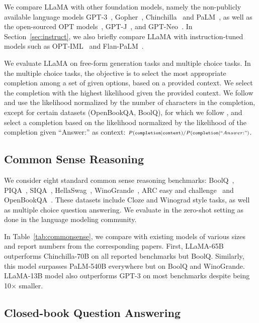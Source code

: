 We compare LLaMA with other foundation models, namely the non-publicly available language models GPT-3~\citep{brown2020gpt3}, Gopher~\citep{rae2021goepher}, Chinchilla~\citep{hoffmann2022chinchilla} and PaLM~\citep{chowdhery2022palm}, as well as the open-sourced OPT models~\citep{zhang2022opt}, GPT-J~\citep{gptj}, and GPT-Neo~\citep{black2022gpt}. In Section~\ref{sec:instruct}, we also briefly compare LLaMA with instruction-tuned models such as OPT-IML~\cite{iyer2022opt} and Flan-PaLM~\cite{Chung2022ScalingIL}.

We evaluate LLaMA on free-form generation tasks and multiple choice tasks. In the multiple choice tasks, the objective is to select the most appropriate completion among a set of given options, based on a provided context. We select the completion with the highest likelihood given the provided context. We follow \citet{eval-harness} and use the likelihood normalized by the number of characters in the completion, except for certain datasets (OpenBookQA, BoolQ), for which we follow \citet{brown2020gpt3}, and select a completion based on the likelihood normalized by the likelihood of the completion given ``Answer:'' as context: ${\scriptstyle P ( \mathtt{completion} \mid \mathtt{context})/P(\mathtt{completion} \mid ``Answer:" ) }$.

\subsection{Common Sense Reasoning}

We consider eight standard common sense reasoning benchmarks: BoolQ~\citep{clark2019boolq}, PIQA~\citep{bisk2020piqa}, SIQA~\citep{sap2019socialiqa}, HellaSwag~\citep{zellers2019hellaswag}, WinoGrande~\citep{sakaguchi2021winogrande}, ARC easy and challenge~\citep{clark2018think} and OpenBookQA~\citep{mihaylov2018can}. These datasets include Cloze and Winograd style tasks, as well as multiple choice question answering. We evaluate in the zero-shot setting as done in the language modeling community.

In Table~\ref{tab:commonsense}, we compare with existing models of various sizes and report numbers from the corresponding papers. First, LLaMA-65B outperforms Chinchilla-70B on all reported benchmarks but BoolQ. Similarly, this model surpasses PaLM-540B everywhere but on BoolQ and WinoGrande. LLaMA-13B model also outperforms GPT-3 on most benchmarks despite being 10$\times$ smaller.

\subsection{Closed-book Question Answering}

